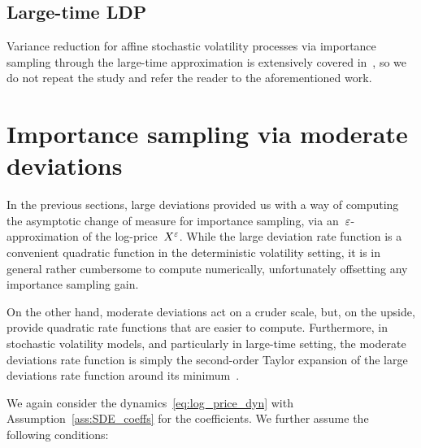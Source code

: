 \subsection{Large-time LDP}
Variance reduction for affine stochastic volatility processes via importance sampling through the large-time approximation is extensively covered in~\cite{Grbac2021Long-TimeModels}, so we do not repeat the study and refer the reader to the aforementioned work.



\section{Importance sampling via moderate deviations}\label{sec:MDP_IS}
In the previous sections, 
large deviations provided us with a way of computing the asymptotic change of measure for importance sampling, 
via an~$\varepsilon$-approximation of the log-price~$X^{\varepsilon}$. While the large deviation rate function is a convenient quadratic function in the deterministic volatility setting, 
it is in general rather cumbersome to compute numerically, 
unfortunately offsetting any importance sampling gain.

On the other hand, moderate deviations act on a cruder scale, but, on the upside, provide quadratic rate functions that are easier to compute. Furthermore, in stochastic volatility models, and particularly in large-time setting, the moderate deviations rate function is simply the second-order Taylor expansion of the large deviations rate function around its minimum~\cite[Remark 3.5]{Jacquier2019PathwisePricing}.

We again consider the dynamics~\eqref{eq:log_price_dyn}
with Assumption~\ref{ass:SDE_coeffs} for the coefficients. 
We further assume the following conditions:

